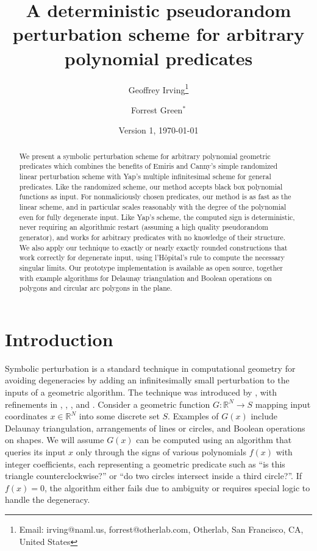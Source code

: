 \documentclass[11pt]{article}
\title{A deterministic pseudorandom perturbation scheme for arbitrary polynomial predicates}
\author{Geoffrey Irving\thanks{Email: irving@naml.us, forrest@otherlab.com, Otherlab, San Francisco, CA, United States}
\and Forrest Green$^*$}
\date{Version 1, \today}
\newcommand{\R}{\mathbb{R}}
\begin{document}
\maketitle

\begin{abstract}
We present a symbolic perturbation scheme for arbitrary polynomial geometric predicates which combines the benefits of
Emiris and Canny's simple randomized linear perturbation scheme with Yap's multiple infinitesimal scheme for general predicates.
Like the randomized scheme, our method accepts black box polynomial functions as input.  For nonmaliciously chosen predicates,
our method is as fast as the linear scheme, and in particular scales reasonably with the degree of the polynomial even for fully
degenerate input.  Like Yap's scheme, the computed sign is deterministic, never requiring an algorithmic restart (assuming a
high quality pseudorandom generator), and works for arbitrary predicates with no knowledge of their structure.  We also apply
our technique to exactly or nearly exactly rounded constructions that work correctly for degenerate input, using l'H\^opital's
rule to compute the necessary singular limits.  Our prototype implementation is available as open source, together with example
algorithms for Delaunay triangulation and Boolean operations on polygons and circular arc polygons in the plane.
\end{abstract}

\section{Introduction}

Symbolic perturbation is a standard technique in computational geometry for avoiding degeneracies by
adding an infinitesimally small perturbation to the inputs of a geometric algorithm.  The technique was introduced by
\cite{edelsbrunner1990simulation}, with refinements in \cite{yap1990symbolic}, \cite{emiris1992efficient}, \cite{emiris1995general},
and \cite{seidel1998nature}.  Consider a geometric function $G : \R^N \to S$ mapping input coordinates $x \in \R^N$ into
some discrete set $S$.  Examples of $G(x)$ include Delaunay triangulation, arrangements of lines or circles, and Boolean operations
on shapes.  We will assume $G(x)$ can be computed using an algorithm that queries its input $x$ only through the
signs of various polynomials $f(x)$ with integer coefficients, each representing a geometric predicate such as
``is this triangle counterclockwise?'' or ``do two circles intersect inside a third circle?''.  If $f(x) = 0$, the algorithm
either fails due to ambiguity or requires special logic to handle the degeneracy.
\end{document}
